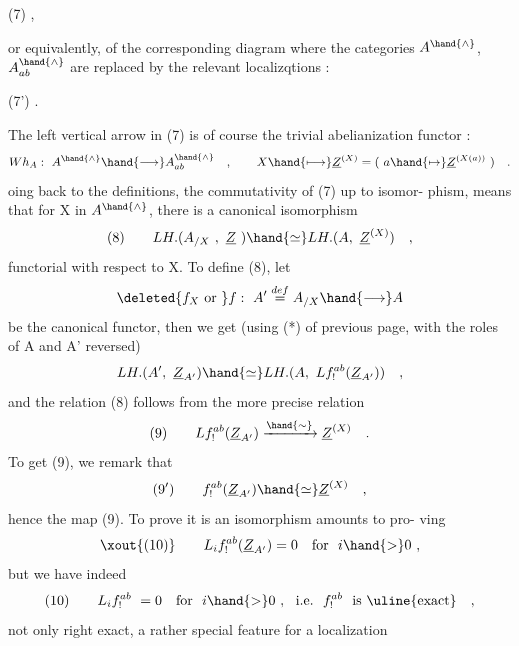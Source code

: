 
(7) \hfill ,

or equivalently,  of the corresponding diagram  where the categories
$A^{\hand{\wedge}}$, $A^{\hand{\wedge}}_{ab}$  are replaced by the relevant localizqtions :

(7') \hfill .

The left vertical arrow in (7)  is of course the trivial abelianization
functor  :
\[ Wh_A :\ A^{\hand{\wedge}} \hand{\longrightarrow} A^{\hand{\wedge}}_{ab} \quad , \qquad X \hand{\longmapsto} \underline{Z}^{(X)} = (\ a \hand{\mapsto} \underline{Z}^{(X(a))}\ ) \quad . \]
oing back to the definitions,  the commutativity of (7) up to isomor-%
phism,  means that for X in $A^{\hand{\wedge}}$,  there is a canonical isomorphism
\[ (8) \qquad LH.(A_{/X}\ ,\ \underline{Z}\ ) \hand{\simeq} LH.(A,\ \underline{Z}^{(X)}) \quad , \]
functorial with respect to X.   To define (8),  let
\[ \deleted{f_X\ \text{or }}f :\ A' \overset{def}{=} A_{/X} \hand{\longrightarrow} A \]
be the canonical functor,  then we get (using (*) of previous page,
with the roles of A and A' reversed)
\[ LH.(A',\ \underline{Z}_{A'}) \hand{\simeq} LH.(A,\ Lf^{ab}_{!}(\underline{Z}_{A'})) \quad , \]
and the relation (8) follows from the more precise relation
\[ (9) \qquad Lf^{ab}_{!}(\underline{Z}_{A'}) \xrightarrow{\hand{\sim}} \underline{Z}^{(X)} \quad . \]
To get  (9),  we remark that  
\[ (9') \qquad f^{ab}_{!}(\underline{Z}_{A'}) \hand{\simeq} \underline{Z}^{(X)} \quad , \]
hence the  map (9).  To prove it is an isomorphism amounts to pro-%
ving
\[ \xout{(10)} \qquad L_i f^{ab}_{!}(\underline{Z}_{A'}) = 0 \quad \text{for} \ \ i \hand{>} 0 \ , \]
but we have indeed
\[ (10) \qquad L_i f^{ab}_{!} \ = 0 \quad \text{for} \ \ i \hand{>} 0 \ , \ \ \text{i.e.} \ \ f^{ab}_{!} \ \ \text{is \uline{exact}} \quad , \]
not only right exact,  a rather special feature\hand{,}  for a localization



